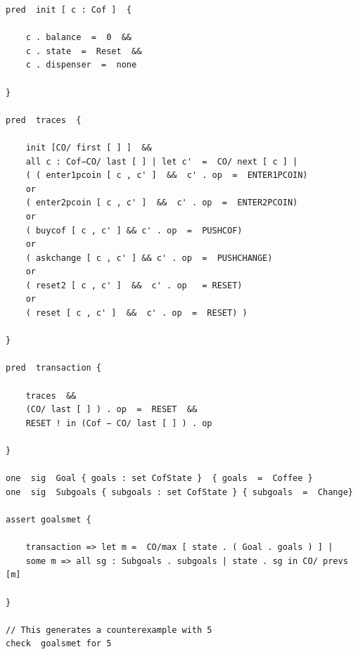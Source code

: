 \documentclass[a4paper,12pt]{extarticle}
\begin{document}
\begin{verbatim}
pred  init [ c : Cof ]  {

	c . balance  =  0  &&
	c . state  =  Reset  &&
	c . dispenser  =  none

}

pred  traces  {

	init [CO/ first [ ] ]  &&
	all c : Cof−CO/ last [ ] | let c'  =  CO/ next [ c ] |
	( ( enter1pcoin [ c , c' ]  &&  c' . op  =  ENTER1PCOIN)
	or
	( enter2pcoin [ c , c' ]  &&  c' . op  =  ENTER2PCOIN)
	or
	( buycof [ c , c' ] && c' . op  =  PUSHCOF)
	or
	( askchange [ c , c' ] && c' . op  =  PUSHCHANGE)
	or
	( reset2 [ c , c' ]  &&  c' . op   = RESET)
	or
	( reset [ c , c' ]  &&  c' . op  =  RESET) )

}

pred  transaction {

	traces  &&
	(CO/ last [ ] ) . op  =  RESET  &&
	RESET ! in (Cof − CO/ last [ ] ) . op

}

one  sig  Goal { goals : set CofState }  { goals  =  Coffee }
one  sig  Subgoals { subgoals : set CofState } { subgoals  =  Change}

assert goalsmet {

	transaction => let m =  CO/max [ state . ( Goal . goals ) ] |
	some m => all sg : Subgoals . subgoals | state . sg in CO/ prevs [m]

}

// This generates a counterexample with 5
check  goalsmet for 5

\end{verbatim}
\clearpage
\end{document}
